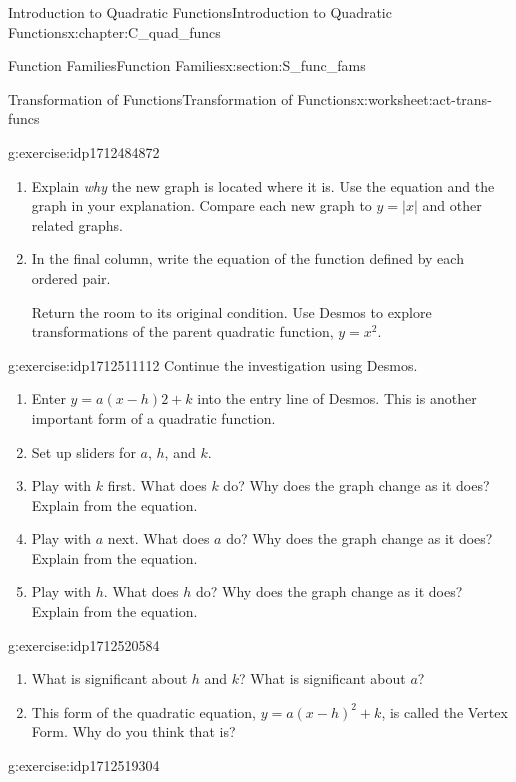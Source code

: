 \documentclass[oneside,10pt,]{book}
\numberwithin{equation}{chapter}
\begin{document}
\begin{chapterptx}{Introduction to Quadratic Functions}{}{Introduction to Quadratic Functions}{}{}{x:chapter:C_quad_funcs}
\begin{sectionptx}{Function Families}{}{Function Families}{}{}{x:section:S_func_fams}
\begin{worksheet-subsection}{Transformation of Functions}{}{Transformation of Functions}{}{}{x:worksheet:act-trans-funcs}
\begin{divisionexercise}{4}{}{}{g:exercise:idp1712484872}
\begin{enumerate}[font=\bfseries,label=(\alph*),ref=\alph*]
\begin{tableptx}{\textbf{}}{x:table:tbl-transform}{}
{\begin{tabular}{Accccc}
\end{tabular}
}%
\end{tableptx}%
\item{}Explain \emph{why} the new graph is located where it is. Use the equation and the graph in your explanation. Compare each new graph to \(y = |x|\) and other related graphs.%
\item{}In the final column, write the equation of the function defined by each ordered pair.%
\par
Return the room to its original condition. Use Desmos to explore transformations of the parent quadratic function, \(y = x^2\).%
\end{enumerate}
\end{divisionexercise}%
\begin{divisionexercise}{5}{}{}{g:exercise:idp1712511112}%
Continue the investigation using Desmos.%
\begin{enumerate}[font=\bfseries,label=(\alph*),ref=\alph*]
\item{}Enter \(y = a(x - h)2 + k\) into the entry line of Desmos. This is another important form of a quadratic function.%
\item{}Set up sliders for \(a\), \(h\), and \(k\).%
\item{}Play with \(k\) first. What does \(k\) do? Why does the graph change as it does? Explain from the equation.%
\item{}Play with \(a\) next. What does \(a\) do? Why does the graph change as it does? Explain from the equation.%
\item{}Play with \(h\). What does \(h\) do? Why does the graph change as it does? Explain from the equation.%
\end{enumerate}
\end{divisionexercise}%
\begin{divisionexercise}{6}{}{}{g:exercise:idp1712520584}%
\begin{enumerate}[font=\bfseries,label=(\alph*),ref=\alph*]
\item{}What is significant about \(h\) and \(k\)? What is significant about \(a\)?%
\item{}This form of the quadratic equation, \(y = a(x - h)^2 + k\), is called the Vertex Form. Why do you think that is?%
\end{enumerate}
\end{divisionexercise}%
\begin{divisionexercise}{7}{}{}{g:exercise:idp1712519304}%

\end{divisionexercise}
\end{worksheet-subsection}
\end{sectionptx}
\end{chapterptx}
\end{document}
